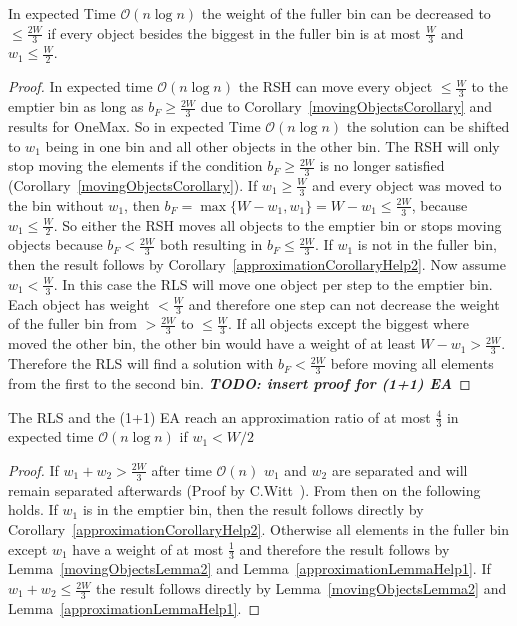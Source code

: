 \begin{lemma}\label{movingObjectsLemma2}
    In expected Time $\mathcal{O}(n\log{}n)$ the weight of the fuller bin can be decreased to \(\le \frac{2W}{3}\) if every object besides the biggest in the fuller bin is at most $\frac{W}{3}$ and \(w_1 \le \frac{W}{2}\).
\end{lemma}
\begin{proof}
    In expected time $\mathcal{O}(n\log{}n)$ the RSH can move every object $\le \frac{W}{3}$ to the emptier bin as long as $b_F \ge \frac{2W}{3}$ due to Corollary~\ref{movingObjectsCorollary} and results for OneMax. So in expected Time $\mathcal{O}(n\log{}n)$ the solution can be shifted to $w_1$ being in one bin and all other objects in the other bin. The RSH will only stop moving the elements if the condition $b_F \ge \frac{2W}{3}$ is no longer satisfied (Corollary~\ref{movingObjectsCorollary}). If \(w_1 \ge \frac{W}{3}\) and every object was moved to the bin without $w_1$, then \(b_F = \max\{W-w_1, w_1\} = W-w_1 \le \frac{2W}{3}\), because \(w_1 \le \frac{W}{2}\). So either the RSH moves all objects to the emptier bin or stops moving objects because $b_F < \frac{2W}{3}$ both resulting in $b_F \le \frac{2W}{3}$. If $w_1$ is not in the fuller bin, then the result follows by Corollary~\ref{approximationCorollaryHelp2}.\newline
    Now assume \(w_1 < \frac{W}{3}\). In this case the RLS will move one object per step to the emptier bin. Each object has weight $< \frac{W}{3}$ and therefore one step can not decrease the weight of the fuller bin from $> \frac{2W}{3}$ to $\le \frac{W}{3}$. If all objects except the biggest where moved the other bin, the other bin would have a weight of at least \(W-w_1 > \frac{2W}{3}\). Therefore the RLS will find a solution with $b_F < \frac{2W}{3}$ before moving all elements from the first to the second bin. \textbf{\textit{TODO: insert proof for (1+1) EA}}
\end{proof}

\begin{lemma}\label{approximationLemma}
    The RLS and the (1+1) EA reach an approximation ratio of at most $\frac{4}{3}$ in expected time $\mathcal{O}(n\log{}n)$ if $w_1 < W/2$
\end{lemma}
\begin{proof}    
    If \(w_1+w_2 > \frac{2W}{3}\) after time $\mathcal{O}(n)$ $w_1$ and $w_2$ are separated and will remain separated afterwards (Proof by C.Witt~\cite{diekert2005stacs}). From then on the following holds. If $w_1$ is in the emptier bin, then the result follows directly by Corollary~\ref{approximationCorollaryHelp2}. Otherwise all elements in the fuller bin except $w_1$ have a weight of at most $\frac{1}{3}$ and therefore the result follows by Lemma~\ref{movingObjectsLemma2} and Lemma~\ref{approximationLemmaHelp1}. If \(w_1+w_2 \le \frac{2W}{3}\) the result follows directly by Lemma~\ref{movingObjectsLemma2} and Lemma~\ref{approximationLemmaHelp1}.
\end{proof}

